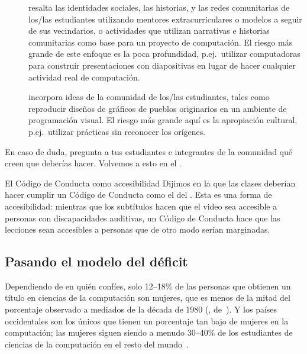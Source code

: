 \begin{description}

\item[{}]
  resalta las identidades sociales, las historias, y las redes comunitarias de los/las estudiantes
  utilizando mentores extracurriculares o modelos a seguir de sus vecindarios,
  o actividades que utilizan narrativas e historias comunitarias
  como base para un proyecto de computación.
  El riesgo más grande de este enfoque es la poca profundidad,
  p.ej.\ utilizar computadoras para construir presentaciones con diapositivas en lugar de hacer cualquier actividad real de computación.

\item[{}]
  incorpora ideas de la comunidad de los/las estudiantes,
  tales como reproducir diseños de gráficos de pueblos originarios en un ambiente de programación visual.
  El riesgo más grande aquí es la apropiación cultural,
  p.ej.\ utilizar prácticas sin reconocer los orígenes.

\end{description}

En caso de duda,
pregunta a tus estudiantes e integrantes de la comunidad qué creen que deberías hacer.
Volvemos a esto en el .

\begin{aside}{El Código de Conducta como accesibilidad}
  Dijimos en la  que las clases deberían hacer cumplir un Código de Conducta como el del .
  Esta es una forma de accesibilidad:
  mientras que los subtítulos hacen que el video sea accesible a personas con discapacidades auditivas,
  un Código de Conducta hace que las lecciones sean accesibles a personas que de otro modo serían marginadas.
\end{aside}

\subsection*{Pasando el modelo del déficit}

Dependiendo de en quién confíes,
solo 12--18\% de las personas que obtienen un título en ciencias de la computación son mujeres,
que es menos de la mitad del porcentaje observado a mediados de la década de 1980
(, de~\cite{Robe2017}).
Y los países occidentales son los únicos que tienen un porcentaje tan bajo de mujeres en la computación;
las mujeres siguen siendo a menudo 30--40\% de los estudiantes de ciencias de la computación en el resto del mundo~\cite{Galp2002,Varm2015}.

